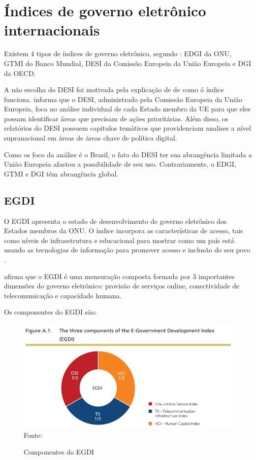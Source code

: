 \chapter{Índices de governo eletrônico internacionais}

Existem 4 tipos de índices de governo eletrônico, segundo \cite{martinez2022egovernment}: EDGI da ONU, GTMI do Banco Mundial, DESI da Comissão Europeia da União Europeia e DGI da OECD.

A não escolha do DESI foi motivada pela explicação de \cite{desi_2022} de como ó índice funciona. \cite{desi_2022} informa que o DESI, administrado pela Comissão Europeia da União Europeia, foca no análise individual de cada Estado membro da UE para que eles possam identificar áreas que precisam de ações prioritárias. Além disso, os relatórios do DESI possuem capítulos temáticos que providenciam analises a nível supranacional em áreas de áreas chave de política digital.

Como os foco da análise é o Brasil, o fato do DESI ter sua abrangência limitada a União Europeia afastou a possibilidade de seu uso. Contrariamente, o EDGI, GTMI e DGI têm abrangência global.

\section{EGDI}

O EGDI apresenta o estado de desenvolvimento de governo eletrônico dos Estados membros da ONU. O índice incorpora as características de acesso, tais como níveis de infraestrutura e educacional para mostrar como um país está usando as tecnologias de informação para promover acesso e inclusão do seu povo \cite{ONU_EGDI}.

\cite{ONU_EGDI} afirma que o EGDI é uma mensuração composta formada por 3 importantes dimensões do governo eletrônico: provisão de serviços online, conectividade de telecomunicação e capacidade humana.

Os componentes do EGDI são:

\begin{figure}[H]
	\centering
	\caption{Componentes do EGDI}
	\includegraphics[width=1\linewidth]{figuras/egdi/egdi_componentes.png}
	\label{fig:egdi_componentes}
	\footnotesize{Fonte: \cite{ONU_EGDI_methodology}}
\end{figure}

